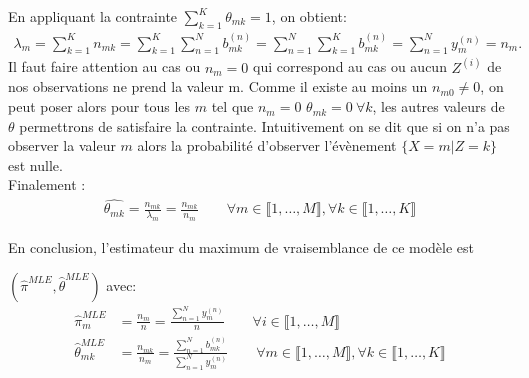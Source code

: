 \documentclass{article}
\begin{document}
En appliquant la contrainte $\sum_{k=1}^{K}{\theta_{mk}}=1$, on obtient:
\begin{align*}
\lambda_{m}=\sum_{k=1}^{K}n_{mk} = \sum_{k=1}^{K} \sum_{n=1}^{N} b_{mk}^{(n)} = \sum_{n=1}^{N} \sum_{k=1}^{K} b_{mk}^{(n)} = \sum_{n=1}^{N}y_m^{(n)}=n_m.
\end{align*}
Il faut faire attention au cas ou $n_m = 0$ qui correspond au cas ou aucun $Z^{(i)}$ de nos observations ne prend la valeur m. Comme il existe au moins un $n_{m0} \neq 0 $, on peut poser alors pour tous les $m$ tel que $n_m = 0$ $\theta_{mk} = 0 \  \forall k $, les autres valeurs de $\theta$ permettrons de satisfaire la contrainte. Intuitivement on se dit que si on n'a pas observer la valeur $m$ alors la probabilité d'observer l'évènement $\{X=m|Z=k\}$ est nulle. \\
Finalement :
\begin{align*} 
\widehat{\theta_{mk}}=\frac{n_{mk}}{\lambda_m} 
=\frac{n_{mk}}{n_m}
\qquad \forall m\in \llbracket 1,\ldots,M \rrbracket, \forall k\in \llbracket 1,\ldots,K \rrbracket
\end{align*}

En conclusion, l'estimateur du maximum de vraisemblance de ce modèle est

$(\widehat{\pi}^{MLE},\widehat{\theta}^{MLE})$ avec:
\[
\boxed{
\begin{align*}
\widehat{\pi}^{MLE}_{m} &=\frac{n_m}{n}=\frac{\sum_{n=1}^{N}{y_m^{(n)}}}{n}
\qquad \forall i\in \llbracket 1,\ldots,M \rrbracket
     \\
    \widehat{\theta}^{MLE}_{mk} &= \frac{n_{mk}}{n_m}= \frac{\sum_{n=1}^{N}b_{mk}^{(n)}}{\sum_{n=1}^{N}{y_m^{(n)}}}\qquad \forall m\in \llbracket 1,\ldots,M \rrbracket, \forall k\in \llbracket 1,\ldots,K \rrbracket
\end{align*}
}
\]
\end{document}

